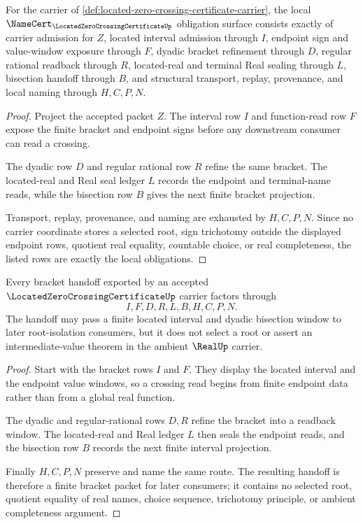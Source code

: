 \begin{theorem}
\label{thm:located-zero-crossing-certificate-namecert-obligations}
For the carrier of \autoref{def:located-zero-crossing-certificate-carrier}, the local $\NameCert_{\LocatedZeroCrossingCertificateUp}$ obligation surface consists exactly of carrier admission for $Z$, located interval admission through $I$, endpoint sign and value-window exposure through $F$, dyadic bracket refinement through $D$, regular rational readback through $R$, located-real and terminal Real sealing through $L$, bisection handoff through $B$, and structural transport, replay, provenance, and local naming through $H,C,P,N$.
\end{theorem}
\begin{proof}
Project the accepted packet $Z$. The interval row $I$ and function-read row $F$ expose the finite bracket and endpoint signs before any downstream consumer can read a crossing.

The dyadic row $D$ and regular rational row $R$ refine the same bracket. The located-real and Real seal ledger $L$ records the endpoint and terminal-name reads, while the bisection row $B$ gives the next finite bracket projection.

Transport, replay, provenance, and naming are exhausted by $H,C,P,N$. Since no carrier coordinate stores a selected root, sign trichotomy outside the displayed endpoint rows, quotient real equality, countable choice, or real completeness, the listed rows are exactly the local obligations.
\end{proof}

\begin{theorem}
\label{thm:located-zero-crossing-certificate-bracket-handoff}
Every bracket handoff exported by an accepted $\LocatedZeroCrossingCertificateUp$ carrier factors through
$$
I,F,D,R,L,B,H,C,P,N .
$$
The handoff may pass a finite located interval and dyadic bisection window to later root-isolation consumers, but it does not select a root or assert an intermediate-value theorem in the ambient $\RealUp$ carrier.
\end{theorem}
\begin{proof}
Start with the bracket rows $I$ and $F$. They display the located interval and the endpoint value windows, so a crossing read begins from finite endpoint data rather than from a global real function.

The dyadic and regular-rational rows $D,R$ refine the bracket into a readback window. The located-real and Real ledger $L$ then seals the endpoint reads, and the bisection row $B$ records the next finite interval projection.

Finally $H,C,P,N$ preserve and name the same route. The resulting handoff is therefore a finite bracket packet for later consumers; it contains no selected root, quotient equality of real names, choice sequence, trichotomy principle, or ambient completeness argument.
\end{proof}

